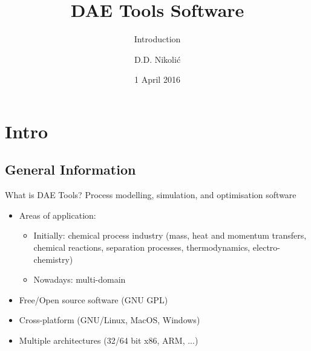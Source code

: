 \documentclass[compress,newPxFont,sthlmFooter]{beamer}
\title{DAE Tools Software}
\subtitle{Introduction}
\author{D.D. Nikolić}
\institute
{
  DAE Tools Project, \url{http://www.daetools.com}
}
\date{1 April 2016}
\begin{document}
\maketitle



\section{Intro}
\subsection{General Information}

\begin{frame}{What is DAE Tools?} 
Process \alert{modelling}, \alert{simulation}, and \alert{optimisation} software
\begin{itemize}
  \item Areas of application:
    \begin{itemize}
      \item Initially: chemical process industry (mass, heat and momentum transfers, chemical reactions, 
                                                  separation processes, thermodynamics, electro-chemistry)
      \item Nowadays: \alert{multi-domain}
    \end{itemize}
  \item Free/Open source software (\alert{GNU GPL})
  \item \alert{Cross-platform} (GNU/Linux, MacOS, Windows)
  \item \alert{Multiple architectures} (32/64 bit x86, ARM, ...)
\end{itemize}
\end{frame}
\end{document}
